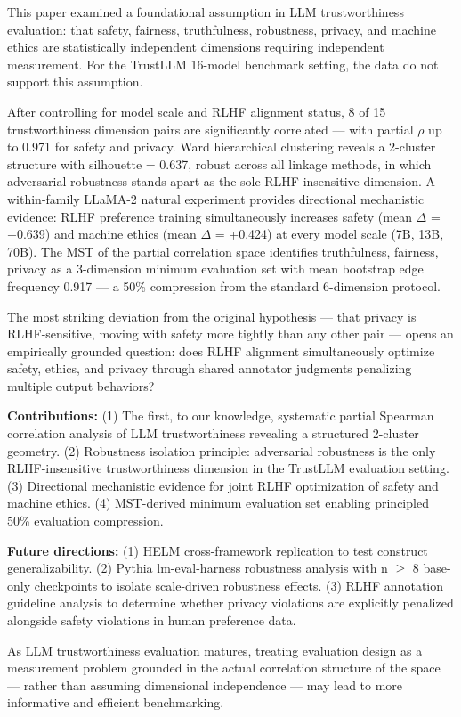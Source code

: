 
This paper examined a foundational assumption in LLM trustworthiness evaluation: that safety, fairness, truthfulness, robustness, privacy, and machine ethics are statistically independent dimensions requiring independent measurement. For the TrustLLM 16-model benchmark setting, the data do not support this assumption.

After controlling for model scale and RLHF alignment status, 8 of 15 trustworthiness dimension pairs are significantly correlated --- with partial $\rho$ up to 0.971 for safety and privacy. Ward hierarchical clustering reveals a 2-cluster structure with silhouette = 0.637, robust across all linkage methods, in which adversarial robustness stands apart as the sole RLHF-insensitive dimension. A within-family LLaMA-2 natural experiment provides directional mechanistic evidence: RLHF preference training simultaneously increases safety (mean $\Delta$ = +0.639) and machine ethics (mean $\Delta$ = +0.424) at every model scale (7B, 13B, 70B). The MST of the partial correlation space identifies {truthfulness, fairness, privacy} as a 3-dimension minimum evaluation set with mean bootstrap edge frequency 0.917 --- a 50\% compression from the standard 6-dimension protocol.

The most striking deviation from the original hypothesis --- that privacy is RLHF-sensitive, moving with safety more tightly than any other pair --- opens an empirically grounded question: does RLHF alignment simultaneously optimize safety, ethics, and privacy through shared annotator judgments penalizing multiple output behaviors?

\textbf{Contributions:} (1) The first, to our knowledge, systematic partial Spearman correlation analysis of LLM trustworthiness revealing a structured 2-cluster geometry. (2) Robustness isolation principle: adversarial robustness is the only RLHF-insensitive trustworthiness dimension in the TrustLLM evaluation setting. (3) Directional mechanistic evidence for joint RLHF optimization of safety and machine ethics. (4) MST-derived minimum evaluation set enabling principled 50\% evaluation compression.

\textbf{Future directions:} (1) HELM cross-framework replication to test construct generalizability. (2) Pythia lm-eval-harness robustness analysis with n $\geq$ 8 base-only checkpoints to isolate scale-driven robustness effects. (3) RLHF annotation guideline analysis to determine whether privacy violations are explicitly penalized alongside safety violations in human preference data.

As LLM trustworthiness evaluation matures, treating evaluation design as a measurement problem grounded in the actual correlation structure of the space --- rather than assuming dimensional independence --- may lead to more informative and efficient benchmarking.


